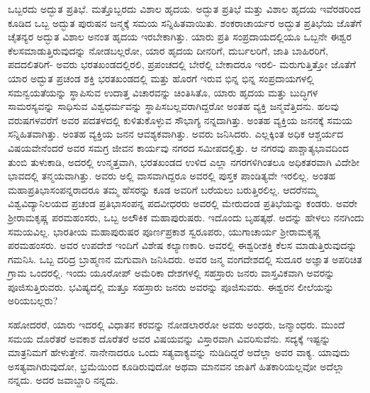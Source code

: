 ಒಬ್ಬರದು ಅದ್ಭುತ ಪ್ರತಿಭೆ. ಮತ್ತೊಬ್ಬರದು ವಿಶಾಲ ಹೃದಯ. ಅದ್ಭುತ ಪ್ರತಿಭೆ ಮತ್ತು ವಿಶಾಲ ಹೃದಯ ಇವೆರಡರಿಂದ ಕೂಡಿದ ಒಬ್ಬ ಅದ್ಭುತ ಪುರುಷನ ಜನ್ಮಕ್ಕೆ ಸಮಯ ಸನ್ನಿಹಿತ\-ವಾಯಿತು. ಶಂಕರಾಚಾರ್ಯರ ಅದ್ಭುತ ಪ್ರತಿಭೆಯ ಜೊತೆಗೆ ಚೈತನ್ಯರ ಅದ್ಭುತ ವಿಶಾಲ ಅನಂತ ಹೃದಯ ಇರಬೇಕಾಗಿತ್ತು. ಯಾರು ಪ್ರತಿ ಸಂಪ್ರದಾಯದಲ್ಲಿಯೂ ಒಬ್ಬನೇ ಈಶ್ವರ ಕೆಲಸಮಾಡುತ್ತಿರುವುದನ್ನು ನೋಡಬಲ್ಲರೋ, ಯಾರ ಹೃದಯ ದೀನರಿಗೆ, ದುರ್ಬಲರಿಗೆ, ಜಾತಿ ಬಾಹಿರರಿಗೆ, ಪದದಲಿತರಿಗೆ- ಅವರು ಭರತಖಂಡದಲ್ಲಿರಲಿ, ಪ್ರಪಂಚದಲ್ಲಿ ಬೇರೆಲ್ಲಿ ಬೇಕಾದರೂ ಇರಲಿ- ಮರುಗುತ್ತಿತ್ತೋ ಜೊತೆಗೆ ಯಾರ ಅದ್ಭುತ ಪ್ರಚಂಡ ಶಕ್ತಿ ಭರತಖಂಡದಲ್ಲಿ ಮತ್ತು ಹೊರಗೆ ಇರುವ ಭಿನ್ನ ಭಿನ್ನ ಸಂಪ್ರದಾಯಗಳಲ್ಲಿ ಸಮನ್ವಯತೆಯನ್ನು ಸ್ಥಾಪಿಸುವ ಉದಾತ್ತ ವಿಚಾರವನ್ನು ಚಿಂತಿಸಿತೊ, ಯಾರು ಹೃದಯ ಮತ್ತು ಬುದ್ಧಿಗಳ ಸಾಮರಸ್ಯವನ್ನು ಸಾಧಿಸುವ ವಿಶ್ವಧರ್ಮವನ್ನು ಸ್ಥಾಪಿಸಬಲ್ಲವರಾಗಿದ್ದರೋ ಅಂತಹ ವ್ಯಕ್ತಿ ಜನ್ಮವೆತ್ತಿದನು. ಹಲವು ವರುಷಗಳವರೆಗೆ ಅವರ ಪದತಳದಲ್ಲಿ ಕುಳಿತುಕೊಳ್ಳುವ ಸೌಭಾಗ್ಯ ನನ್ನದಾಗಿತ್ತು. ಅಂತಹ ವ್ಯಕ್ತಿಯ ಜನನಕ್ಕೆ ಸಮಯ ಸನ್ನಿಹಿತವಾಗಿತ್ತು. ಅಂತಹ ವ್ಯಕ್ತಿಯ ಜನನ ಆವಶ್ಯಕವಾಗಿತ್ತು. ಅವರು ಜನಿಸಿದರು. ಎಲ್ಲಕ್ಕಿಂತ ಅಧಿಕ ಆಶ್ಚರ್ಯದ ವಿಷಯವೇನೆಂದರೆ ಅವರ ಸಮಗ್ರ ಜೀವನ ಕಾರ್ಯವು ನಗರದ ಸಮೀಪದಲ್ಲಿತ್ತು. ಆ ನಗರವು ಪಾಶ್ಚಾತ್ಯ\break ಭಾವದಿಂದ ತುಂಬಿ ತುಳುಕಾಡಿ, ಅದರಲ್ಲಿ ಉನ್ಮತ್ತವಾಗಿ, ಭರತಖಂಡದ ಉಳಿದ ಎಲ್ಲಾ ನಗರಗಳಿಗಿಂತಲೂ ಅಧಿಕತರವಾಗಿ ವಿದೇಶೀ ಭಾವದಲ್ಲಿ ತನ್ಮಯವಾಗಿತ್ತು. ಅವರು ಅಲ್ಲಿ ವಾಸವಾಗಿದ್ದರೂ ಅವರಲ್ಲಿ ಪುಸ್ತಕ ಪಾಂಡಿತ್ಯವೇ ಇರಲಿಲ್ಲ. ಅಂತಹ ಮಹಾಪ್ರತಿಭಾ\break ಸಂಪನ್ನರಾದರೂ ತಮ್ಮ ಹೆಸರನ್ನು ಕೂಡ ಅವರಿಗೆ ಬರೆಯಲು ಬರುತ್ತಿರಲಿಲ್ಲ. ಆದರೆ\break ನಮ್ಮ ವಿಶ್ವವಿದ್ಯಾನಿಲಯದ ಪ್ರಚಂಡ ಪ್ರತಿಭಾಸಂಪನ್ನ ಪದವೀಧರರು ಅವರಲ್ಲಿ ಮೇರುದಂಡ ಪ್ರತಿಭೆಯನ್ನು ಕಂಡರು. ಅವರೇ ಶ‍್ರೀರಾಮಕೃಷ್ಣ ಪರಮಹಂಸರು, ಒಬ್ಬ ಅಲೌಕಿಕ ಮಹಾಪುರುಷರು. ಇದೊಂದು ಬೃಹತ್ಕಥೆ. ಅದನ್ನು ಹೇಳಲು ನನಗಿಂದು ಸಮಯವಿಲ್ಲ. ಭಾರತೀಯ ಮಹಾಪುರುಷರ ಪೂರ್ಣಪ್ರಕಾಶ ಸ್ವರೂಪರು, ಯುಗಾಚಾರ್ಯ ಶ‍್ರೀರಾಮಕೃಷ್ಣ ಪರಮಹಂಸರು. ಅವರ ಉಪದೇಶ ಇಂದಿಗೆ ವಿಶೇಷ ಕಲ್ಯಾಣಕಾರಿ. ಅವರಲ್ಲಿ ಈಶ್ವರೀಶಕ್ತಿ ಕೆಲಸ ಮಾಡುತ್ತಿರುವುದನ್ನು ಗಮನಿಸಿ. ಒಬ್ಬ ದರಿದ್ರ ಬ್ರಾಹ್ಮಣನ ಮಗುವಾಗಿ ಜನಿಸಿದರು. ಅವರ ಜನ್ಮ ವಂಗದೇಶದಲ್ಲಿ ಸುದೂರ ಅಜ್ಞಾತ ಅಪರಿಚಿತ ಗ್ರಾಮ ಒಂದರಲ್ಲಿ. ಇಂದು ಯೂರೋಪ್​ ಅಮೆರಿಕಾ ದೇಶಗಳಲ್ಲಿ ಸಹಸ್ರಾರು ಜನರು ವಾಸ್ತವಿಕವಾಗಿ ಅವರನ್ನು ಪೂಜಿಸುತ್ತಿರುವರು. ಭವಿಷ್ಯದಲ್ಲಿ ಮತ್ತೂ ಸಹಸ್ರಾರು ಜನರು ಅವರನ್ನು ಪೂಜಿಸುವರು. ಈಶ್ವರನ ಲೀಲೆಯನ್ನು ಅರಿಯಬಲ್ಲರು?

ಸಹೋದರರೆ, ಯಾರು ಇದರಲ್ಲಿ ವಿಧಾತನ ಕರವನ್ನು ನೋಡಲಾರರೋ ಅವರು ಅಂಧರು, ಜನ್ಮಾಂಧರು. ಮುಂದೆ ಸಮಯ ದೊರೆತರೆ ಅವಕಾಶ ದೊರೆತರೆ ಅವರ ವಿಷಯವನ್ನು ವಿಸ್ತಾರವಾಗಿ ವಿವರಿಸುವೆನು. ಸದ್ಯಕ್ಕೆ ಇಷ್ಟನ್ನು ಮಾತ್ರನಿಮಗೆ ಹೇಳುತ್ತೇನೆ. ನಾನೇನಾದರೂ ಒಂದು ಸತ್ಯವಾಕ್ಯವನ್ನು ನುಡಿದಿದ್ದರೆ ಅದೆಲ್ಲಾ ಅವರ ವಾಕ್ಯ. ಯಾವುದು ಅಸತ್ಯವಾಗಿರುವುದೋ, ಭ್ರಮೆಯಿಂದ ಕೂಡಿರುವುದೋ ಅಥವಾ ಮಾನವನ ಜಾತಿಗೆ ಹಿತಕಾರಿಯಲ್ಲವೋ ಅದೆಲ್ಲಾ ನನ್ನದು. ಅದರ ಜವಾಬ್ದಾರಿ ನನ್ನದು.


